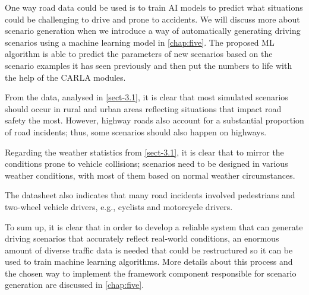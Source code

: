 One way road data could be used is to train AI models to predict what situations could be challenging to drive and prone to accidents. We will discuss more about scenario generation when we introduce a way of automatically generating driving scenarios using a machine learning model in \autoref{chap:five}. The proposed ML algorithm is able to predict the parameters of new scenarios based on the scenario examples it has seen previously and then put the numbers to life with the help of the CARLA modules.

From the data, analysed in \autoref{sect-3.1}, it is clear that most simulated scenarios should occur in rural and urban areas reflecting situations that impact road safety the most. However, highway roads also account for a substantial proportion of road incidents; thus, some scenarios should also happen on highways.

Regarding the weather statistics from \autoref{sect-3.1}, it is clear that to mirror the conditions prone to vehicle collisions; scenarios need to be designed in various weather conditions, with most of them based on normal weather circumstances.

The datasheet also indicates that many road incidents involved pedestrians and two-wheel vehicle drivers, e.g., cyclists and motorcycle drivers. 

To sum up, it is clear that in order to develop a reliable system that can generate driving scenarios that accurately reflect real-world conditions, an enormous amount of diverse traffic data is needed that could be restructured so it can be used to train machine learning algorithms. More details about this process and the chosen way to implement the framework component responsible for scenario generation are discussed in \autoref{chap:five}.
